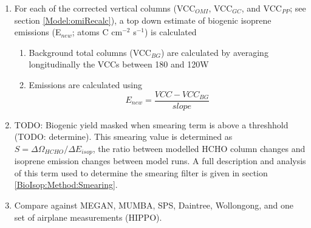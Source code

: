 \begin{enumerate}
      GEOS-Chem modelled biogenic emissions of isoprene along with total biogenic columns of HCHO, both averaged over 2x2.5\degr horizontally  and 1300-1400~LT temporally, are used to calculate a linear regression slope.
      \begin{enumerate}
        \item Globally gridded biogenic emissions of isoprene output from GEOS-Chem are read in as E$_{GC}$~atoms C cm$^{-2}$ s$^{-1}$.
        \item Satellite overpass output of total HCHO columns from GEOS-Chem are read in as $\Omega_{GC}$\moleccm
        \item A reduced major axis regression slope is found between $\Omega_{GC}$ and E$_{GC}$ using a month of modelled output (one value per day) for each gridsquare (eg. see figure \ref{BioIsop:Method:slope:fig_regressions})
      \end{enumerate}
      \item For each of the corrected vertical columns (VCC$_{OMI}$, VCC$_{GC}$, and VCC$_{PP}$; see section \ref{Model:omiRecalc}), a top down estimate of biogenic isoprene emissions (E$_{new}$; atoms C cm$^{-2}$ s$^{-1}$) is calculated
      \begin{enumerate}
        \item 
          Background total columns (VCC$_{BG}$) are calculated by averaging longitudinally the VCCs between 180 and 120\degr W
        \item
          Emissions are calculated using 
          \begin{equation} \label{BioIsop:Method:eqn_Enew}
            E_{new} = \frac{VCC - VCC_{BG}}{slope}
          \end{equation}
      \end{enumerate}
      \item
        TODO: Biogenic yield masked when smearing term is above a threshhold (TODO: determine).
        This smearing value is determined as $S=\Delta \Omega_{HCHO}/ \Delta E_{isop}$, the ratio between modelled HCHO column changes and isoprene emission changes between model runs. 
        A full description and analysis of this term used to determine the smearing filter is given in section \ref{BioIsop:Method:Smearing}.
      \item 
        Compare against MEGAN, MUMBA, SPS, Daintree, Wollongong, and one set of airplane measurements (HIPPO).
    \end{enumerate}
    
  
